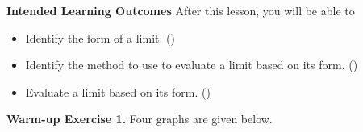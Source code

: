 \documentclass[10pt]{article}
\begin{document}
\pagestyle{otherpages}
\thispagestyle{firstpage}

\textbf{Intended Learning Outcomes}
After this lesson, you will be able to 

\begin{itemize}
    \item Identify the form of a limit. ()
    \item Identify the method to use to evaluate a limit based on its form. ()
    \item Evaluate a limit based on its form. ()
\end{itemize}

\vspace{-0.5cm}

\hrulefill

{\bf\color{blue}Warm-up Exercise 1.} Four graphs are given below.\\
\end{document}
